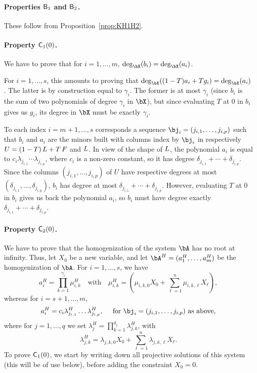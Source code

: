\documentclass[12pt]{article}
\begin{document}
\paragraph{Properties $\mathsf{B}_1$ and $\mathsf{B}_2$.}
These follow from Proposition~\ref{prop:KH1H2}.

\paragraph{Property $\mathsf{C}_1(0)$.} We have to prove that for $i=1,\dots,m$,
$\deg_\bX(b_i)=\deg_\bX(a_i)$. 

For $i=1,\dots,s$, this amounts to proving that $\deg_\bX((1-T) a_i +
T g_i)=\deg_\bX(a_i)$. The latter is by construction equal to
$\gamma_i$. The former is at most $\gamma_i$ (since $b_i$ is the sum
of two polynomials of degree $\gamma_i$ in $\bX$), but since
evaluating $T$ at $0$ in $b_i$ gives us $g_i$, its degree in $\bX$
must be exactly $\gamma_i$.

To each index $i=m+1,\dots,s$ corresponds a sequence
$\bj_i=(j_{i,1},\dots,j_{i,p})$ such that $b_i$ and $a_i$ are the
minors built with columns index by $\bj_i$ in respectively
${U}=(1-T)\, {L} + T \, {F}$ and ${L}$. In view of the shape of ${L}$,
the polynomial $a_i$ is equal to $c_i\lambda_{j_{i,1}}\cdots
\lambda_{j_{i,p}}$, where $c_i$ is a non-zero constant, so it has degree
$\delta_{j_{i,1}} + \cdots + \delta_{j_{i,p}}$.  Since the columns
$(j_{i,1},\dots,j_{i,p})$ of $U$ have respective degrees at most
$(\delta_{j_{i,1}},\dots,\delta_{j_{i,p}})$, $b_i$ has degree at most
$\delta_{j_{i,1}} + \cdots + \delta_{j_{i,p}}$. However, evaluating
$T$ at $0$ in $b_i$ gives us back the polynomial $a_i$, so $b_i$ must
have degree exactly $\delta_{j_{i,1}} + \cdots + \delta_{j_{i,p}}$.

\paragraph{Property $\mathsf{C}_2(0)$.} We have to prove that the homogenization
of the system $\bA$ has no root at infinity. Thus, let $X_0$ be a new
variable, and let $\bA^H=(a_1^H,\dots,a_m^H)$ be the homogenization
of $\bA$. For $i=1,\dots,s$, we have
$$a_i^H=\prod_{k=1}^{\gamma_i} \mu^H_{i,k} \quad\text{with}\quad \mu^H_{i,k}=(\mu_{i,k,0}X_0 + \sum_{\ell = 1}^{n}\mu_{i,k,\ell}X_\ell),$$
whereas for $i=s+1,\dots,m$, 
$$a_i^H=c_i \lambda^H_{j_{i,1}}\ldots \lambda^H_{j_{i,p}}, \quad \text{~for~} \bj_i=(j_{i,1},\dots,j_{i,p}) \text{~as above},$$
where for $j=1,\dots,q$ we set 
$\lambda^H_j = \prod_{k=1}^{\delta_j}\lambda^H_{j,k}$,
with
$$\lambda^H_{j,k}=\lambda_{j,k,0}X_0 + \sum_{\ell = 1}^{n}\lambda_{j,k,\ell}X_\ell.$$
To prove  $\mathsf{C}_1(0)$, we start by writing down all projective
solutions of this system (this will be of use below), before adding
the constraint $X_0=0$.
\end{document}

